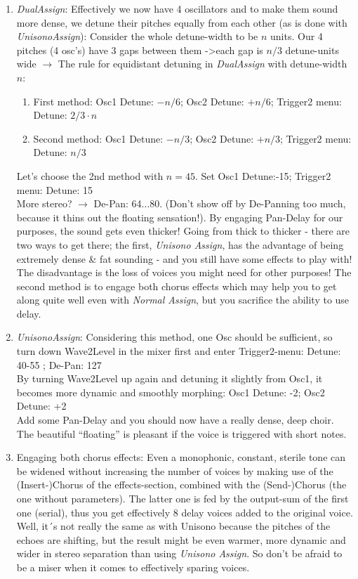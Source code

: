 \begin{enumerate}
	\item \emph{DualAssign}: Effectively we now have 4 oscillators and to make them sound more dense, we detune their pitches equally from each other (as is done with \emph{UnisonoAssign}): Consider the whole detune-width to be $n$ units. Our 4 pitches (4 osc's) have 3 gaps between them ->each gap is $n/3$ detune-units wide $\to$ The rule for equidistant detuning in \emph{DualAssign} with detune-width $n$:
	\begin{enumerate}
		\item First method: Osc1 Detune: $-n/6$; Osc2 Detune: $+n/6$; Trigger2 menu: Detune: $2/3\cdot n$
		\item Second method: Osc1 Detune: $-n/3$; Osc2 Detune: $+n/3$;	Trigger2 menu: Detune: $n/3$
	\end{enumerate}
	Let's choose the 2nd method with $n=45$. Set Osc1 Detune:-15; Trigger2 menu: Detune: 15\\
	More stereo? $\to$ De-Pan: 64...80. (Don't show off by De-Panning too much, because it thins out the floating sensation!). By engaging Pan-Delay for our purposes, the sound gets even thicker! Going from thick to thicker - there are two ways to get there; the first, \emph{Unisono Assign}, has the advantage of being extremely dense \& fat sounding - and you still have some effects to play with! The disadvantage is the loss of voices you might need for other purposes! The second method is to engage both chorus effects which may help you to get along quite well even with \emph{Normal Assign}, but you sacrifice the ability to use delay.
	\item \emph{UnisonoAssign}: Considering this method, one Osc should be sufficient, so turn down Wave2Level in the mixer first and enter
	Trigger2-menu: Detune: 40-55 ; De-Pan: 127\\
	By turning Wave2Level up again and detuning it slightly from Osc1, it becomes more dynamic and smoothly morphing: Osc1 Detune: -2; Osc2 Detune: +2\\
	Add some Pan-Delay and you should now have a really dense, deep choir. The beautiful ``floating'' is pleasant if the voice is triggered with short notes.
	\item Engaging both chorus effects: Even a monophonic, constant, sterile tone can be widened without increasing the number of voices by making use of the (Insert-)Chorus of the effects-section, combined with the (Send-)Chorus (the one without parameters). The latter one is fed by the output-sum of the first one (serial), thus you get effectively 8 delay voices added to the original voice. Well, it´s not really the same as with Unisono because the pitches of the echoes are shifting, but the result might be even warmer, more dynamic and wider in stereo separation than using \emph{Unisono Assign}. So don't be afraid to be a miser when it comes to effectively sparing voices.\\

\end{enumerate}

